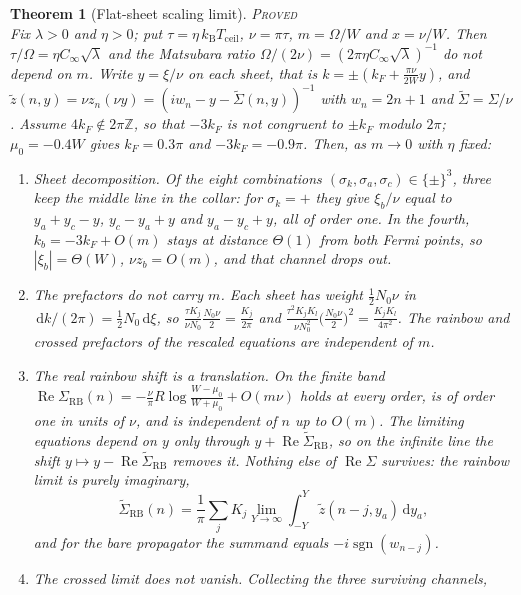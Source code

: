 \documentclass[11pt]{article}
\newcommand{\PROVED}{\upshape\mdseries\textsc{Proved}}
\newcommand{\Cinf}{C_\infty}
\newcommand{\kB}{k_{\mathrm B}}
\newcommand{\Tceil}{T_{\mathrm{ceil}}}
\newcommand{\dd}{\,\mathrm d}
\newtheorem{theorem}{Theorem}[section]
\theoremstyle{definition}
\theoremstyle{remark}
\begin{document}
\begin{theorem}[Flat-sheet scaling limit]\label{thm:flat}\hfill\PROVED\\
Fix $\lambda>0$ and $\eta>0$; put $\tau=\eta\,\kB\Tceil$, $\nu=\pi\tau$, $m=\Omega/W$ and $x=\nu/W$. Then $\tau/\Omega=\eta\Cinf\sqrt\lambda$ and the Matsubara ratio $\Omega/(2\nu)=(2\pi\eta\Cinf\sqrt\lambda)^{-1}$ do not depend on $m$. Write $y=\xi/\nu$ on each sheet, that is $k=\pm(k_F+\frac{\pi\nu}{2W}y)$, and $\tilde z(n,y)=\nu z_n(\nu y)=(iw_n-y-\tilde\Sigma(n,y))^{-1}$ with $w_n=2n+1$ and $\tilde\Sigma=\Sigma/\nu$. Assume $4k_F\notin2\pi\mathbb Z$, so that $-3k_F$ is not congruent to $\pm k_F$ modulo $2\pi$; $\mu_0=-0.4W$ gives $k_F=0.3\pi$ and $-3k_F=-0.9\pi$. Then, as $m\to0$ with $\eta$ fixed:
\begin{enumerate}
\item[(i)] \emph{Sheet decomposition.} Of the eight combinations $(\sigma_k,\sigma_a,\sigma_c)\in\{\pm\}^3$, three keep the middle line in the collar: for $\sigma_k=+$ they give $\xi_b/\nu$ equal to $y_a+y_c-y$, $y_c-y_a+y$ and $y_a-y_c+y$, all of order one. In the fourth, $k_b=-3k_F+O(m)$ stays at distance $\Theta(1)$ from both Fermi points, so $|\xi_b|=\Theta(W)$, $\nu z_b=O(m)$, and that channel drops out.
\item[(ii)] \emph{The prefactors do not carry $m$.} Each sheet has weight $\frac12N_0\nu$ in $\dd k/(2\pi)=\frac12N_0\dd\xi$, so $\frac{\tau K_j}{\nu N_0}\frac{N_0\nu}{2}=\frac{K_j}{2\pi}$ and $\frac{\tau^2K_jK_l}{\nu N_0^2}\big(\frac{N_0\nu}{2}\big)^2=\frac{K_jK_l}{4\pi^2}$. The rainbow and crossed prefactors of the rescaled equations are independent of $m$.
\item[(iii)] \emph{The real rainbow shift is a translation.} On the finite band $\operatorname{Re}\Sigma_{\mathrm{RB}}(n)=-\frac{\nu}{\pi}R\log\frac{W-\mu_0}{W+\mu_0}+O(m\nu)$ holds at every order, is of order one in units of $\nu$, and is independent of $n$ up to $O(m)$. The limiting equations depend on $y$ only through $y+\operatorname{Re}\tilde\Sigma_{\mathrm{RB}}$, so on the infinite line the shift $y\mapsto y-\operatorname{Re}\tilde\Sigma_{\mathrm{RB}}$ removes it. Nothing else of $\operatorname{Re}\Sigma$ survives: the rainbow limit is purely imaginary,
\begin{equation}\label{eq:flatrb}
\tilde\Sigma_{\mathrm{RB}}(n)=\frac1\pi\sum_{j}K_j\lim_{Y\to\infty}\int_{-Y}^{Y}\tilde z(n-j,y_a)\dd y_a ,
\end{equation}
and for the bare propagator the summand equals $-i\operatorname{sgn}(w_{n-j})$.
\item[(iv)] \emph{The crossed limit does not vanish.} Collecting the three surviving channels,

\end{enumerate}
\end{theorem}
\end{document}
